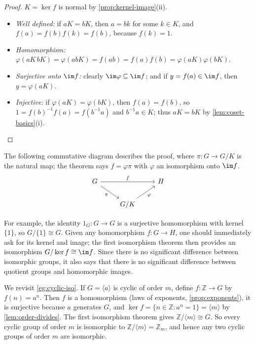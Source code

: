 \begin{proof}
	\(K = \ker f\) is normal by \autoref{prop:kernel-image}(ii).
	\begin{itemize}
		\item \emph{Well defined:} if \(aK = bK\), then \(a = bk\) for some \(k \in K\), and
		      \(f(a) = f(b)f(k) = f(b)\), because \(f(k) = 1\).
		\item \emph{Homomorphism:}
		      \(\varphi(aK\,bK) = \varphi(abK) = f(ab) = f(a)f(b) = \varphi(aK)\varphi(bK)\).
		\item \emph{Surjective onto \(\im f\):} clearly \(\im\varphi \subseteq \im f\); and if
		      \(y = f(a) \in \im f\), then \(y = \varphi(aK)\).
		\item \emph{Injective:} if \(\varphi(aK) = \varphi(bK)\), then \(f(a) = f(b)\), so
		      \(1 = f(b)^{-1}f(a) = f(b^{-1}a)\) and \(b^{-1}a \in K\); thus \(aK = bK\) by
		      \autoref{lem:coset-basics}(i). \qedhere
	\end{itemize}
\end{proof}

\begin{remark}
	The following commutative diagram describes the proof, where \(\pi\colon G \to G/K\) is
	the natural map; the theorem says \(f = \varphi\pi\) with \(\varphi\) an isomorphism
	onto \(\im f\).
	\[
		\begin{tikzcd}
			G \arrow[rr, "f"] \arrow[dr, "\pi"'] & & H \\
			& G/K \arrow[ur, "\varphi"'] &
		\end{tikzcd}
	\]
\end{remark}

For example, the identity \(1_G\colon G \to G\) is a surjective homomorphism with kernel
\(\{1\}\), so \(G/\{1\} \cong G\). Given any homomorphism \(f\colon G \to H\), one should
immediately ask for its kernel and image; the first isomorphism theorem then provides an
isomorphism \(G/\ker f \cong \im f\). Since there is no significant difference between
isomorphic groups, it also says that there is no significant difference between quotient
groups and homomorphic images.

\begin{eg}\label{eg:cyclic-first-iso}
	We revisit \autoref{eg:cyclic-iso}. If \(G = \langle a\rangle\) is cyclic of order
	\(m\), define \(f\colon \mathbb Z \to G\) by \(f(n) = a^n\). Then \(f\) is a
	homomorphism (laws of exponents, \autoref{prop:exponents}), it is surjective because
	\(a\) generates \(G\), and \(\ker f = \{n \in \mathbb Z : a^n = 1\} = \langle m\rangle\)
	by \autoref{lem:order-divides}. The first isomorphism theorem gives
	\(\mathbb Z/\langle m\rangle \cong G\). So every cyclic group of order \(m\) is
	isomorphic to \(\mathbb Z/\langle m\rangle = \mathbb Z_m\), and hence any two cyclic
	groups of order \(m\) are isomorphic.
\end{eg}

